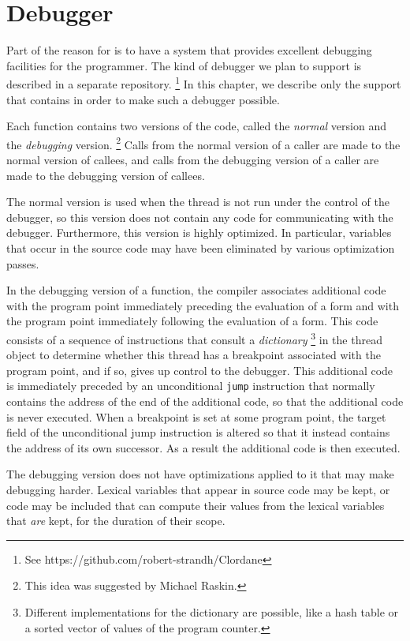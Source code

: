\chapter{Debugger}
\label{chap-debugger}

Part of the reason for \sysname{} is to have a system that provides
excellent debugging facilities for the programmer.  The kind of
debugger we plan to support is described in a separate repository.%
\footnote{See https://github.com/robert-strandh/Clordane}  In this
chapter, we describe only the support that \sysname{} contains in
order to make such a debugger possible.

Each function contains two versions of the code, called the
\emph{normal} version and the \emph{debugging} version.%
\footnote{This idea was suggested by Michael Raskin.}
Calls from the normal version of a caller are made to the normal version
of callees, and calls from the debugging version of a caller are made to
the debugging version of callees.

The normal version is used when the thread is not run under the
control of the debugger, so this version does not contain any code for
communicating with the debugger.  Furthermore, this version is highly
optimized.  In particular, variables that occur in the source code may
have been eliminated by various optimization passes.

In the debugging version of a function, the compiler associates
additional code with the program point immediately preceding the
evaluation of a form and with the program point immediately following
the evaluation of a form.  This code consists of a sequence of
instructions that consult a \emph{dictionary}%
\footnote{Different implementations for the dictionary are possible,
  like a hash table or a sorted vector of values of the program
  counter.}
in the thread object to determine whether this thread has a breakpoint
associated with the program point, and if so, gives up control to the
debugger.  This additional code is immediately preceded by an
unconditional \texttt{jump} instruction that normally contains the
address of the end of the additional code, so that the additional code
is never executed.  When a breakpoint is set at some program point,
the target field of the unconditional jump instruction is altered so
that it instead contains the address of its own successor.  As a
result the additional code is then executed.

The debugging version does not have optimizations applied to it that
may make debugging harder.  Lexical variables that appear in source
code may be kept, or code may be included that can compute their
values from the lexical variables that \emph{are} kept, for the
duration of their scope.



